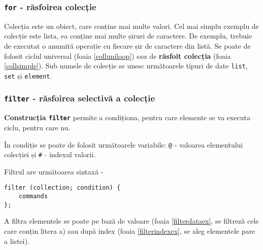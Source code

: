 \begin{sourcecode}
\label{dowhileex}
\inputminted[linenos]{icl}{../sources/dowhileex.icL}
\end{sourcecode}

\subsubsection{\texttt{for} - răsfoirea colecție}

{Colecția} este un obiect, care conține mai multe valori. Cel mai simplu exemplu de colecție este lista, ea conține mai multe șiruri de caractere. De exemplu, trebuie de executat o anumită operație cu fiecare șir de caractere din listă. Se poate de folosit ciclul universal (foaia \ref{colluniloop}) sau de {\bf răsfoit colecția} (foaia \ref{collsimple}). Sub numele de colecție se unesc următoarele tipuri de date \texttt{list}, \texttt{set} și \texttt{element}.

\subsubsection{\texttt{filter} - răsfoirea selectivă a colecție}

{\bf Construcția \texttt{filter}} permite a condiționa, pentru care elemente se va executa ciclu, pentru care nu.

În condiție se poate de folosit următoarele variabile: \texttt{@} - valoarea elementului colecției și \texttt{#} - indexul valorii.

Filtrul are următoarea sintaxă -
\begin{verbatim}
filter (collection; condition) {
	commands
};
\end{verbatim}

A filtra elementele se poate pe bază de valoare (foaia \ref{filterdataex}, se filtreză cele care conțin litera a) sau după index (foaia \ref{filterindexex}, se aleg elementele pare a listei).

\begin{sourcecode}
\label{colluniloop}
\inputminted[linenos]{icl}{../sources/colluniloop.icL}
\end{sourcecode}

\begin{sourcecode}
\label{collsimple}
\inputminted[linenos]{icl}{../sources/collsimple.icL}
\end{sourcecode}

